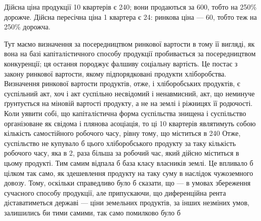 \noindent{}Дійсна ціна продукції 10 квартерів є 240; вони продаються за 600, тобто на 250\% дорожче.
Дійсна пересічна ціна 1 квартера є 24: ринкова ціна — 60, тобто теж на 250\% дорожча.

Тут маємо визначення за посередництвом ринкової вартости в тому її вигляді, як вона на базі
капіталістичного способу продукції пробивається за посередництвом конкуренції; ця остання породжує
фалшиву соціальну вартість. Це постає з закону ринкової вартости, якому підпорядковані продукти
хліборобства.
Визначення ринкової вартости продуктів, отже, і хліборобських продуктів, є суспільний акт, хоч і акт
суспільно несвідомий і ненавмисний, акт, що неминуче ґрунтується на міновій вартості продукту, а не
на землі і ріжницях її родючості. Коли уявити собі, що капіталістична форма суспільства знищена і
суспільство організоване як свідома і плянова асоціація, то ці 10 квартерів являтимуть собою
кількість самостійного робочого часу, рівну тому, що міститься в 240 Отже, суспільство не
купувало б цього хліборобського продукту за таку кількість робочого часу, яка в 2, раза більша
за робочий час, який дійсно міститься в цьому продукті. Тим самим відпала б база класу власників
землі. Це впливало б цілком так само, як здешевлення продукту на таку суму в наслідок чужоземного
довозу. Тому, оскільки справедливо було б сказати, що — в умовах збереження сучасного способу
продукції, але припускаючи, що диференційна рента діставатиметься державі — ціни земельних
продуктів, за інших незміних умов, залишились би тими самими, так само помилково було б
\parbreak{}  %
